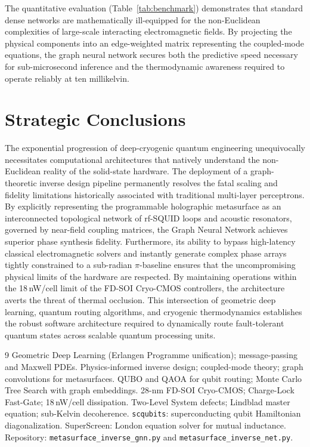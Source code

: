 \documentclass[11pt, a4paper]{article}
\begin{document}
The quantitative evaluation (Table~\ref{tab:benchmark}) demonstrates that standard dense networks are mathematically ill-equipped for the non-Euclidean complexities of large-scale interacting electromagnetic fields. By projecting the physical components into an edge-weighted matrix representing the coupled-mode equations, the graph neural network secures both the predictive speed necessary for sub-microsecond inference and the thermodynamic awareness required to operate reliably at ten millikelvin.

\section{Strategic Conclusions}

The exponential progression of deep-cryogenic quantum engineering unequivocally necessitates computational architectures that natively understand the non-Euclidean reality of the solid-state hardware. The deployment of a graph-theoretic inverse design pipeline permanently resolves the fatal scaling and fidelity limitations historically associated with traditional multi-layer perceptrons. By explicitly representing the programmable holographic metasurface as an interconnected topological network of rf-SQUID loops and acoustic resonators, governed by near-field coupling matrices, the Graph Neural Network achieves superior phase synthesis fidelity. Furthermore, its ability to bypass high-latency classical electromagnetic solvers and instantly generate complex phase arrays tightly constrained to a sub-radian $\pi$-baseline ensures that the uncompromising physical limits of the hardware are respected. By maintaining operations within the 18\,nW/cell limit of the FD-SOI Cryo-CMOS controllers, the architecture averts the threat of thermal occlusion. This intersection of geometric deep learning, quantum routing algorithms, and cryogenic thermodynamics establishes the robust software architecture required to dynamically route fault-tolerant quantum states across scalable quantum processing units.

\begin{thebibliography}{9}
Geometric Deep Learning (Erlangen Programme unification); message-passing and Maxwell PDEs.
Physics-informed inverse design; coupled-mode theory; graph convolutions for metasurfaces.
QUBO and QAOA for qubit routing; Monte Carlo Tree Search with graph embeddings.
28-nm FD-SOI Cryo-CMOS; Charge-Lock Fast-Gate; 18\,nW/cell dissipation.
Two-Level System defects; Lindblad master equation; sub-Kelvin decoherence.
\texttt{scqubits}: superconducting qubit Hamiltonian diagonalization.
SuperScreen: London equation solver for mutual inductance.
Repository: \texttt{metasurface\_inverse\_gnn.py} and \texttt{metasurface\_inverse\_net.py}.
\end{thebibliography}
\end{document}

